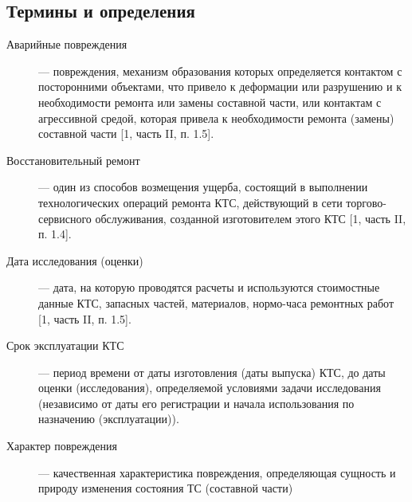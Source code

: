\subsection{Термины и определения}
\begin{description}
	\item[Аварийные повреждения] --- повреждения, механизм образования которых определяется контактом с посторонними объектами, что привело к деформации или разрушению и к необходимости ремонта или замены составной части, или контактам с агрессивной средой, которая привела к необходимости ремонта (замены) составной части [1, часть II, п. 1.5].
	\item[Восстановительный ремонт]--- один из способов возмещения ущерба, состоящий в выполнении технологических операций ремонта КТС, действующий в сети торгово-сервисного обслуживания, созданной изготовителем этого КТС [1, часть II, п. 1.4].
	\item[Дата исследования (оценки)]--- дата, на которую проводятся расчеты и используются стоимостные данные КТС, запасных частей, материалов, нормо-часа ремонтных работ [1, часть II, п. 1.5].
	\item[Срок эксплуатации КТС]--- период времени от даты изготовления (даты выпуска) КТС, до даты оценки (исследования), определяемой условиями задачи исследования (независимо от даты его регистрации и начала использования по назначению (эксплуатации)).
	\item[Характер повреждения]--- качественная характеристика повреждения, определяющая сущность и природу изменения состояния ТС (составной части)

\end{description}
